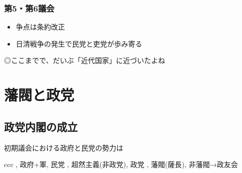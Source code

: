 \documentclass[12pt,fleqn]{ltjsarticle}
\begin{document}
\subsubsection*{第5・第6議会}
\begin{itemize}
\item 争点は条約改正
\item 日清戦争の発生で民党と吏党が歩み寄る
\end{itemize}

◎ここまでで、だいぶ「近代国家」に近づいたよね


\clearpage
\section{藩閥と政党}
\subsection{政党内閣の成立}
初期議会における政府と民党の勢力は
\begin{csvtab}{ccc}
, 政府+軍, 民党
, 超然主義(非政党), 政党
, 藩閥(薩長), 非藩閥→政友会
\end{csvtab}
\end{document}
